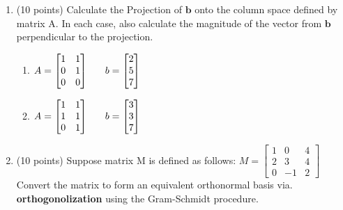 \documentclass{article}%
\begin{document}
\begin{enumerate}

    \item (10 points) Calculate the Projection of \emph{$\mathbf{b}$} onto the column space defined by matrix A.  In each case, also calculate the magnitude of the vector from $\mathbf{b}$ perpendicular to the projection.
    \begin{enumerate}
        \item $A = \begin{bmatrix}
            1 & 1\\
            0 & 1\\
            0 & 0
        \end{bmatrix}\hspace{4ex}
        b = \begin{bmatrix}
            2\\
            5\\
            7
        \end{bmatrix}$
        
        \item $A = \begin{bmatrix}
            1 & 1\\
            1 & 1\\
            0 & 1
        \end{bmatrix}\hspace{4ex}
        b = \begin{bmatrix}
            3\\
            3\\
            7
        \end{bmatrix}$
    \end{enumerate}



    \item (10 points) Suppose matrix M is defined as follows:
    $M = \begin{bmatrix}
            1 & 0 & 4\\
            2 & 3 & 4\\
            0 & -1 & 2
        \end{bmatrix}$
    Convert the matrix to form an equivalent orthonormal basis via. \textbf{orthogonolization} using the Gram-Schmidt procedure.



\end{enumerate}
\end{document}
